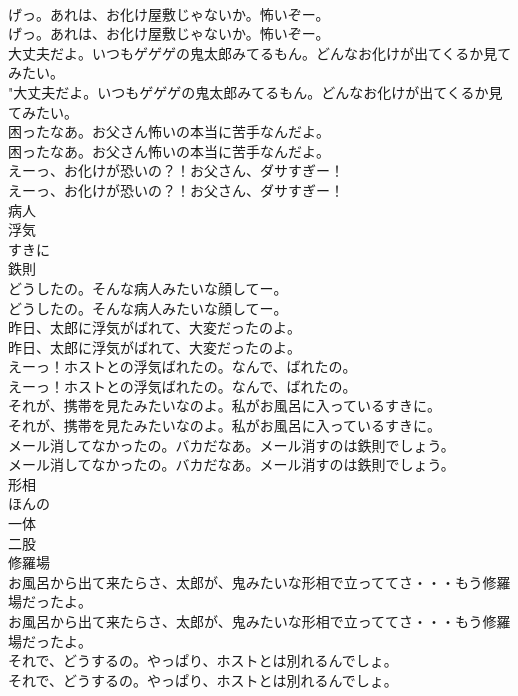 \documentclass[8pt]{extreport}
\begin{document}
\begin{CJK}{UTF8}{min}
\\	げっ。あれは、お化け屋敷じゃないか。怖いぞー。	
\\	げっ。あれは、お化け屋敷じゃないか。怖いぞー。 
\\	大丈夫だよ。いつもゲゲゲの鬼太郎みてるもん。どんなお化けが出てくるか見てみたい。	
\\	"大丈夫だよ。いつもゲゲゲの鬼太郎みてるもん。どんなお化けが出てくるか見てみたい。 
\\	困ったなあ。お父さん怖いの本当に苦手なんだよ。	
\\	困ったなあ。お父さん怖いの本当に苦手なんだよ。 
\\	えーっ、お化けが恐いの？！お父さん、ダサすぎー！	
\\	えーっ、お化けが恐いの？！お父さん、ダサすぎー！ 
\\	病人
\\	浮気
\\	すきに
\\	鉄則
\\	どうしたの。そんな病人みたいな顔してー。	
\\	どうしたの。そんな病人みたいな顔してー。 
\\	昨日、太郎に浮気がばれて、大変だったのよ。	
\\	昨日、太郎に浮気がばれて、大変だったのよ。 
\\	えーっ！ホストとの浮気ばれたの。なんで、ばれたの。	
\\	えーっ！ホストとの浮気ばれたの。なんで、ばれたの。 
\\	それが、携帯を見たみたいなのよ。私がお風呂に入っているすきに。	
\\	それが、携帯を見たみたいなのよ。私がお風呂に入っているすきに。 
\\	メール消してなかったの。バカだなあ。メール消すのは鉄則でしょう。	
\\	メール消してなかったの。バカだなあ。メール消すのは鉄則でしょう。 
\\	形相
\\	ほんの
\\	一体
\\	二股
\\	修羅場
\\	お風呂から出て来たらさ、太郎が、鬼みたいな形相で立っててさ・・・もう修羅場だったよ。	
\\	お風呂から出て来たらさ、太郎が、鬼みたいな形相で立っててさ・・・もう修羅場だったよ。 
\\	それで、どうするの。やっぱり、ホストとは別れるんでしょ。	
\\	それで、どうするの。やっぱり、ホストとは別れるんでしょ。 

\end{CJK}
\end{document}
